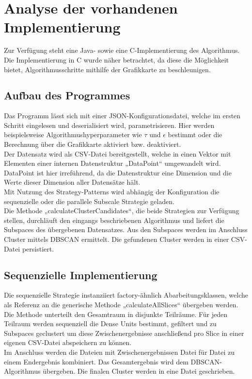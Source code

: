 \section{Analyse der vorhandenen Implementierung}
Zur Verfügung steht eine Java- sowie eine C-Implementierung des Algorithmus. Die Implementierung in C wurde näher
betrachtet, da diese die Möglichkeit bietet, Algorithmusschritte mithilfe der Grafikkarte zu beschleunigen.

\subsection{Aufbau des Programmes}
Das Programm lässt sich mit einer JSON-Konfigurationsdatei, welche im ersten Schritt eingelesen und deserialisiert wird,
parametrisieren. Hier werden beispielsweise Algorithmushyperparameter wie $\tau$ und $\epsilon$ bestimmt oder die
Berechnung über die Grafikkarte aktiviert bzw. deaktiviert.\\
Der Datensatz wird als CSV-Datei bereitgestellt, welche in einen Vektor mit Elementen einer internen Datenstruktur
„DataPoint“ umgewandelt wird. DataPoint ist hier irreführend, da die Datenstruktur eine Dimension und die Werte dieser
Dimension aller Datensätze hält.\\
Mit Nutzung des Strategy-Patterns wird abhängig der Konfiguration die sequenzielle oder die parallele Subscale Strategie
geladen.\\
Die Methode „calculateClusterCandidates“, die beide Strategien zur Verfügung stellen, durchläuft den eingangs
beschriebenen Algorithmus und liefert die Subspaces des übergebenen Datensatzes. Aus den Subspaces werden im Anschluss
Cluster mittels DBSCAN ermittelt. Die gefundenen Cluster werden in einer CSV-Datei persistiert.

\subsection{Sequenzielle Implementierung}
Die sequenzielle Strategie instanziiert factory-ähnlich Abarbeitungsklassen, welche als Referenz an die generische
Methode „calculateAllSlices“ übergeben werden.\\
Die Methode unterteilt den Gesamtraum in disjunkte Teilräume. Für jeden Teilraum werden sequenziell die Dense Units
bestimmt, gefiltert und zu Subspaces geclustert um diese Zwischenergebnisse anschließend pro Slice in einer eigenen
CSV-Datei abspeichern zu können.\\
Im Anschluss werden die Dateien mit Zwischenergebnissen Datei für Datei zu einem Endergebnis kombiniert. Das
Gesamtergebnis wird dem DBSCAN-Algorithmus übergeben. Die finalen Cluster werden in eine Datei geschrieben.

